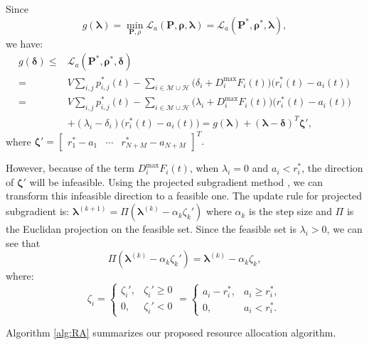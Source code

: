 \documentclass[journal,draftclsnofoot,onecolumn,12pt]{IEEEtran}%
\newcommand{\Pb}{\boldsymbol{P}}
\newcommand{\deltab}{\boldsymbol{\delta}}
\newcommand{\lambdab}{\boldsymbol{\lambda}}
\begin{document}
\begin{IEEEproof}
Since 
\begin{equation}
g(\lambdab)=\min_{\Pb,\rho}\mathcal{L}_a(\boldsymbol{P}, \boldsymbol{\rho},\lambdab)=\mathcal{L}_a(\boldsymbol{P}^*, \mathbf{\rho}^*,\lambdab),
\end{equation}
 we have:
\begin{align}
g(\boldsymbol{\deltab} )\leq& \mathcal{L}_a(\boldsymbol{P}^*, \mathbf{\rho}^*,\deltab)\nonumber\\
=&V\sum_{i,j}p^*_{i,j}(t)-\sum_{i\in \mathcal{M} \cup \mathcal{H}} \big(\delta_i+D_i^{\max}F_i(t)\big) \big(r^*_i(t)-a_i(t)\big)\nonumber\\
=&V\sum_{i,j}p^*_{i,j}(t)-\sum_{i\in \mathcal{M} \cup \mathcal{H}} \big(\lambda_i+D_i^{\max}F_i(t)\big) \big(r^*_i(t)-a_i(t)\big)\nonumber\\
&+(\lambda_i-\delta_i)\big(r^*_i(t)-a_i(t)\big)=g(\lambdab)+(\lambdab-\deltab)^T\boldsymbol \zeta',
\end{align}
where 
$
\boldsymbol \zeta'=\begin{bmatrix}
r_1^*-a_1 &\cdots & r_{N+M}^*-a_{N+M}
\end{bmatrix}^T.
$

{However, because of the term $D_i^{\max}F_i(t)$,  when $\lambda_i=0$ and $a_i<r_i^*$, the direction of $\boldsymbol \zeta'$ will be infeasible}. Using the projected subgradient method \cite{boyd2006subgradient}, we can transform this infeasible direction to a feasible one. The update rule for projected subgradient is:
$
\lambdab^{(k+1)}=\Pi (\lambdab^{(k)}- \alpha_k \zeta_k')
$
where $\alpha_k$ is the step size and $\Pi$ is the Euclidan projection on the feasible set. Since the feasible set is $\lambda_i>0$, we can see that 
\begin{equation}
\Pi (\lambdab^{(k)}- \alpha_k \zeta_k')=\lambdab^{(k)}- \alpha_k \zeta_k,
\end{equation}
where: 
\begin{equation}
\zeta_i=\begin{cases}
\zeta_i', &\zeta_i'\geq0\\
0, &\zeta_i'<0
\end{cases}=\begin{cases}
a_i-r_i^*, &a_i \geq r_i^*,\\
0, &a_i<r_i^*.
\end{cases}
\end{equation}
\end{IEEEproof}
{Algorithm \ref{alg:RA} summarizes our proposed resource allocation algorithm.} 
\end{document}
